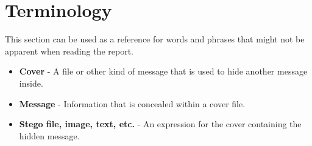 \section{Terminology}
This section can be used as a reference for words and phrases that might not be apparent when reading the report.

\begin{itemize}
	\item\textbf{Cover} - A file or other kind of message that is used to hide another message inside.
	\item\textbf{Message} - Information that is concealed within a cover file.
	\item\textbf{Stego file, image, text, etc.} - An expression for the cover containing the hidden message.
\end{itemize}